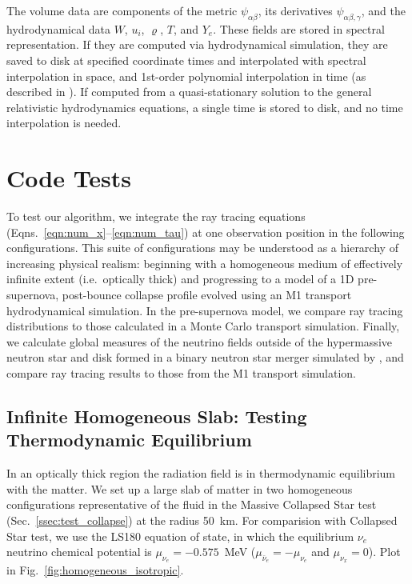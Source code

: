 \documentclass[aps,floatfix,prd,superscriptaddress,twocolumn]{revtex4-1}
\newcommand{\todo}[1]{\marginpar{\tiny{\textcolor{red}{#1}}}}
\begin{document}
The volume data are components of the metric $\psi_{\alpha\beta}$,
its derivatives $\psi_{\alpha\beta,\gamma}$,
and the hydrodynamical data $W$, $u_i$, $\varrho$, $T$, and $Y_e$.
These fields are stored in spectral representation.
If they are computed via hydrodynamical simulation, they are saved to disk
at specified coordinate times and interpolated
with spectral interpolation in space,
and 1st-order polynomial interpolation in time
(as described in \cite[App.~B]{bohn2016-code}).
If computed from a quasi-stationary solution to the
\todo{clarify quasistationary timescale}
general relativistic hydrodynamics equations,
a single time is stored to disk, and no time interpolation is needed.

\section{Code Tests}
\label{sec:tests}

To test our algorithm, we integrate the ray tracing equations
(Eqns.~\ref{eqn:num_x}--\ref{eqn:num_tau}) at one observation position
in the following configurations. This suite of configurations
may be understood as a hierarchy of increasing physical realism:
beginning with a homogeneous medium of effectively
infinite extent (i.e.\ optically thick) and progressing to a model of a
1D pre-supernova, post-bounce collapse profile
evolved using an M1 transport hydrodynamical simulation.
In the pre-supernova model, we compare ray tracing distributions
to those calculated in a Monte Carlo transport simulation.
Finally, we calculate global measures of the neutrino fields outside of the
hypermassive neutron star and disk formed in a binary neutron star
merger simulated by \cite{fouc2016-m1_nsns, fouc2016-m1_evolve_n},
and compare ray tracing results to those from the M1 transport simulation.

\subsection{Infinite Homogeneous Slab:
  Testing Thermodynamic Equilibrium}
\label{ssec:test_equilibrium}
In an optically thick region the radiation field is in thermodynamic equilibrium
with the matter.
We set up a large slab of matter in two homogeneous configurations
representative of the fluid in the Massive Collapsed Star test
(Sec.~\ref{ssec:test_collapse}) at the radius 50~km.
For comparision with Collapsed Star test, we use the LS180 equation of state,
in which the equilibrium $\nu_e$ neutrino chemical potential is
$\mu_{\nu_e}=-0.575$~MeV
($\mu_{\bar{\nu}_e}=-\mu_{\nu_e}$ and $\mu_{\nu_x}=0$).
Plot in Fig.~\ref{fig:homogeneous_isotropic}.
\end{document}
